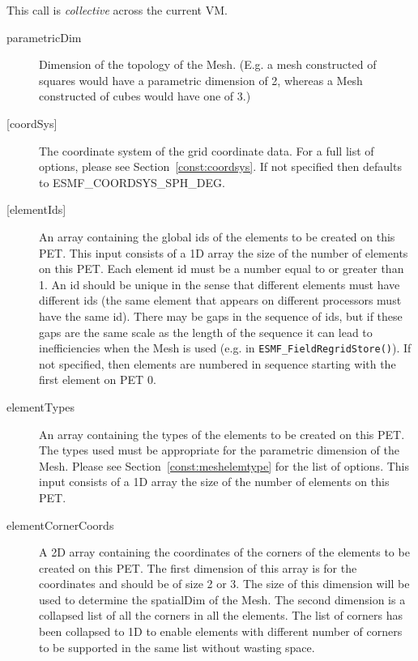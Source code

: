      This call is {\em collective} across the current VM.
  
     \begin{description}
     \item [parametricDim]
           Dimension of the topology of the Mesh. (E.g. a mesh constructed of squares would
           have a parametric dimension of 2, whereas a Mesh constructed of cubes would have one
           of 3.)
     \item[{[coordSys]}]
           The coordinate system of the grid coordinate data.
           For a full list of options, please see Section~\ref{const:coordsys}.
           If not specified then defaults to ESMF\_COORDSYS\_SPH\_DEG.
     \item [{[elementIds]}]
            An array containing the global ids of the elements to be created on this PET.
            This input consists of a 1D array the size of the number of elements on this PET.
            Each element id must be a number equal to or greater than 1. An id should be
            unique in the sense that different elements must have different ids (the same element
            that appears on different processors must have the same id). There may be gaps in the sequence
            of ids, but if these gaps are the same scale as the length of the sequence it can lead to
            inefficiencies when the Mesh is used (e.g. in {\tt ESMF\_FieldRegridStore()}).
            If not specified, then elements are numbered in sequence starting with the first element
            on PET 0.
     \item[elementTypes]
            An array containing the types of the elements to be created on this PET. The types used
            must be appropriate for the parametric dimension of the Mesh. Please see
            Section~\ref{const:meshelemtype} for the list of options. This input consists of
            a 1D array the size of the number of elements on this PET.
     \item[elementCornerCoords]
           A 2D array containing the coordinates of the corners of the elements
           to be created on this PET. The first dimension of this array is for the
           coordinates and should be of size 2 or 3. The size of this dimension will be
           used to determine the spatialDim of the Mesh. The second dimension is a collapsed
           list of all the corners in all the elements. The list of corners has been collapsed
           to 1D to enable elements with different number of corners to be supported in the
           same list without wasting space.

\end{description}
